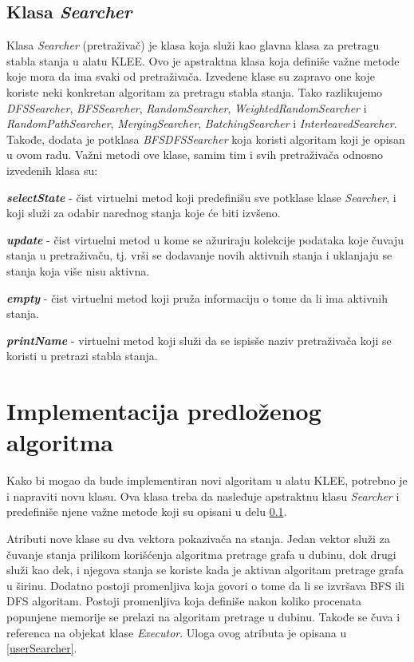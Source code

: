 \documentclass[12pt,oneside]{memoir}
\begin{document}
\subsection{Klasa \textit{Searcher}} \label{pretrazivac}
Klasa \textit{Searcher} (pretraživač) je klasa koja služi kao glavna klasa za pretragu stabla stanja u alatu KLEE. Ovo je apstraktna klasa koja definiše važne metode koje mora da ima svaki od pretraživača. Izvedene klase su zapravo one koje koriste neki konkretan algoritam za pretragu stabla stanja. Tako razlikujemo \textit{DFSSearcher}, \textit{BFSSearcher}, \textit{RandomSearcher}, \textit{WeightedRandomSearcher} i \textit{RandomPathSearcher}, \textit{MergingSearcher}, \textit{BatchingSearcher} i \textit{InterleavedSearcher}. Takođe, dodata je potklasa \textit{BFSDFSSearcher} koja koristi algoritam koji je opisan u ovom radu. Važni metodi ove klase, samim tim i svih pretraživača odnosno izvedenih klasa su:
\begin{description}
    \item \textbf{\textit{selectState}} - čist virtuelni metod koji predefinišu sve potklase klase \textit{Searcher}, i koji služi za odabir narednog stanja koje će biti izvšeno.
    
    \item \textbf{\textit{update}} - čist virtuelni metod u kome se ažuriraju kolekcije podataka koje čuvaju stanja u pretraživaču, tj. vrši se dodavanje novih aktivnih stanja i uklanjaju se stanja koja više nisu aktivna. 
    
    \item \textbf{\textit{empty}} - čist virtuelni metod koji pruža informaciju o tome da li ima aktivnih stanja.
    
    \item \textbf{\textit{printName}} - virtuelni metod koji služi da se ispisše naziv pretraživača koji se koristi u pretrazi stabla stanja.
\end{description}

\section{Implementacija predloženog algoritma}
Kako bi mogao da bude implementiran novi algoritam u alatu KLEE, potrebno je i napraviti novu klasu. Ova klasa treba da nasleđuje apstraktnu klasu \textit{Searcher} i predefiniše njene važne metode koji su opisani u delu \ref{pretrazivac}. 

Atributi nove klase su dva vektora pokazivača na stanja. Jedan vektor služi za čuvanje stanja prilikom korišćenja algoritma pretrage grafa u dubinu, dok drugi služi kao dek, i njegova stanja se koriste kada je aktivan algoritam pretrage grafa u širinu. Dodatno postoji promenljiva koja govori o tome da li se izvršava BFS ili DFS algoritam. Postoji promenljiva koja definiše nakon koliko procenata popunjene memorije se prelazi na algoritam pretrage u dubinu. Takođe se čuva i referenca na objekat klase \textit{Executor}. Uloga ovog atributa je opisana u \ref{userSearcher}.
\end{document}

